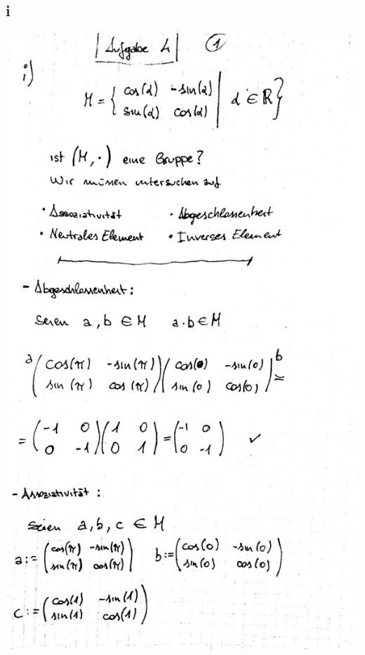 \documentclass[12pt,a4paper]{article}
\begin{document}
\subsection{i}
\includegraphics[scale=0.2]{lat4e_1.jpg} 
\newpage
\end{document}

